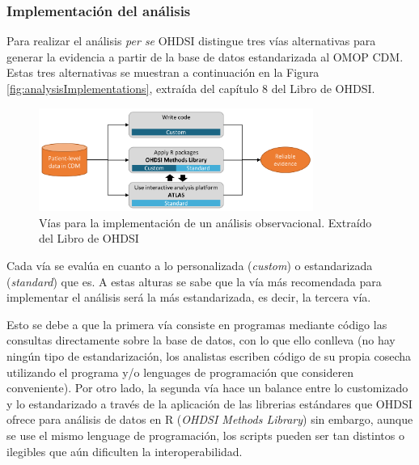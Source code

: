 
\subsubsection{Implementación del análisis}

Para realizar el análisis \textit{per se} OHDSI distingue tres vías alternativas para generar la evidencia a partir de la base de datos estandarizada al OMOP CDM. Estas tres alternativas se muestran a continuación en la Figura \ref{fig:analysisImplementations}, extraída del capítulo 8 del Libro de OHDSI.

\begin{figure}[H]
    \centering
    \includegraphics[width=0.80\textwidth]{figures/analysisImplementations.png}
     \caption{Vías para la implementación de un análisis observacional. Extraído del Libro de OHDSI \cite{OHDSIbook}}
    \label{fig:analysisImplementations }
\end{figure}

Cada vía se evalúa en cuanto a lo personalizada (\textit{custom}) o estandarizada (\textit{standard}) que es. A estas alturas se sabe que la vía más recomendada para implementar el análisis será la más estandarizada, es decir, la tercera vía.

Esto se debe a que la primera vía consiste en programas mediante código las consultas directamente sobre la base de datos, con lo que ello conlleva (no hay ningún tipo de estandarización, los analistas escriben código de su propia cosecha utilizando el programa y/o lenguages de programación que consideren conveniente). Por otro lado, la segunda vía hace un balance entre lo customizado y lo estandarizado a través de la aplicación de las librerias estándares que OHDSI ofrece para análisis de datos en R (\textit{OHDSI Methods Library}) sin embargo, aunque se use el mismo lenguage de programación, los scripts pueden ser tan distintos o ilegibles que aún dificulten la interoperabilidad.

